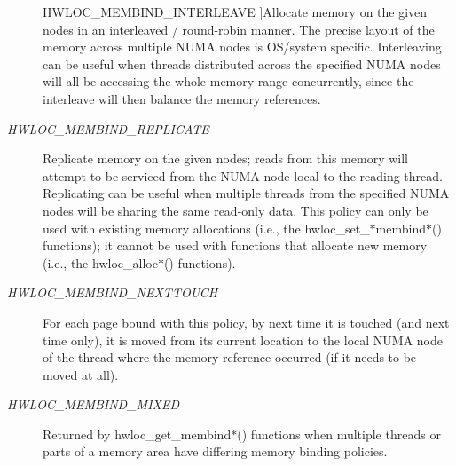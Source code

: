 \begin{Desc}
\begin{description}
{\hypertarget{a00050_ggac9764f79505775d06407b40f5e4661e8ae370075e5af016d42310f87ea5af236b}{
HWLOC\_\-MEMBIND\_\-INTERLEAVE}
\label{a00050_ggac9764f79505775d06407b40f5e4661e8ae370075e5af016d42310f87ea5af236b}
}]Allocate memory on the given nodes in an interleaved / round-\/robin manner. The precise layout of the memory across multiple NUMA nodes is OS/system specific. Interleaving can be useful when threads distributed across the specified NUMA nodes will all be accessing the whole memory range concurrently, since the interleave will then balance the memory references. \item[{\em 
\hypertarget{a00050_ggac9764f79505775d06407b40f5e4661e8afb37480fe5f4236eb7dd4aef26f691e9}{
HWLOC\_\-MEMBIND\_\-REPLICATE}
\label{a00050_ggac9764f79505775d06407b40f5e4661e8afb37480fe5f4236eb7dd4aef26f691e9}
}]Replicate memory on the given nodes; reads from this memory will attempt to be serviced from the NUMA node local to the reading thread. Replicating can be useful when multiple threads from the specified NUMA nodes will be sharing the same read-\/only data. This policy can only be used with existing memory allocations (i.e., the hwloc\_\-set\_\-$\ast$membind$\ast$() functions); it cannot be used with functions that allocate new memory (i.e., the hwloc\_\-alloc$\ast$() functions). \item[{\em 
\hypertarget{a00050_ggac9764f79505775d06407b40f5e4661e8aecdd4164d647708fbb51a00d98dbb138}{
HWLOC\_\-MEMBIND\_\-NEXTTOUCH}
\label{a00050_ggac9764f79505775d06407b40f5e4661e8aecdd4164d647708fbb51a00d98dbb138}
}]For each page bound with this policy, by next time it is touched (and next time only), it is moved from its current location to the local NUMA node of the thread where the memory reference occurred (if it needs to be moved at all). \item[{\em 
\hypertarget{a00050_ggac9764f79505775d06407b40f5e4661e8a3185bd869b67817fb2bd5164bf360402}{
HWLOC\_\-MEMBIND\_\-MIXED}
\label{a00050_ggac9764f79505775d06407b40f5e4661e8a3185bd869b67817fb2bd5164bf360402}
}]Returned by hwloc\_\-get\_\-membind$\ast$() functions when multiple threads or parts of a memory area have differing memory binding policies. \end{description}
\end{Desc}



